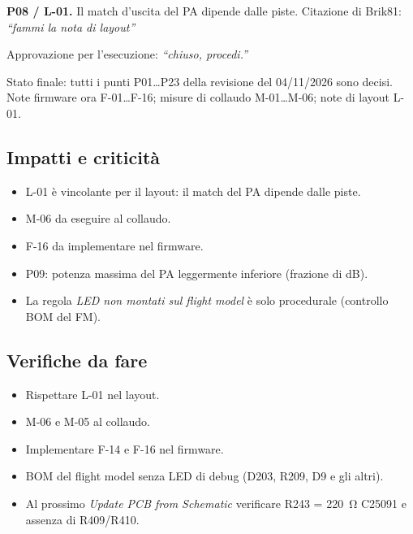 \textbf{P08 / L-01.} Il match d'uscita del PA dipende dalle piste. Citazione di Brik81: \emph{``fammi la nota di layout''}

Approvazione per l'esecuzione: \emph{``chiuso, procedi.''}

Stato finale: tutti i punti P01\ldots P23 della revisione del 04/11/2026 sono decisi. Note firmware ora F-01\ldots F-16; misure di collaudo M-01\ldots M-06; note di layout L-01.

\subsection{Impatti e criticità}
\begin{tcolorbox}[enhanced,breakable,colback=boxwarnbg,colframe=boxwarn,boxrule=0.8pt,left=7pt,right=6pt,top=4pt,bottom=4pt,
  title={\sffamily\bfseries Impatti},fonttitle=\small,coltitle=white,colbacktitle=boxwarn]
\begin{itemize}
\item L-01 è vincolante per il layout: il match del PA dipende dalle piste.
\item M-06 da eseguire al collaudo.
\item F-16 da implementare nel firmware.
\item P09: potenza massima del PA leggermente inferiore (frazione di dB).
\item La regola \emph{LED non montati sul flight model} è solo procedurale (controllo BOM del FM).
\end{itemize}
\end{tcolorbox}

\subsection{Verifiche da fare}
\begin{itemize}
\item Rispettare L-01 nel layout.
\item M-06 e M-05 al collaudo.
\item Implementare F-14 e F-16 nel firmware.
\item BOM del flight model senza LED di debug (D203, R209, D9 e gli altri).
\item Al prossimo \emph{Update PCB from Schematic} verificare R243 = \SI{220}{\ohm} C25091 e assenza di R409/R410.
\end{itemize}
